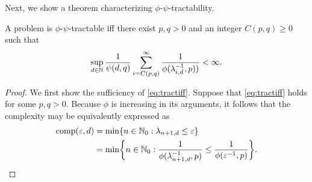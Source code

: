 \documentclass[11pt,a4paper]{article}
\begin{document}
Next, we show a theorem characterizing $\phi$-$\psi$-tractability. 
\begin{theorem}\label{thm_main_tract} 
A problem is $\phi$-$\psi$-tractable iff there exist $p,q>0$ and an integer $C(p,q) \ge 0$ such that
\begin{equation} \label{eq:tractiff}
     \sup_{d \in \mathbb{N}} \frac{1}{\psi(d,q)} \sum_{i = C(p,q)}^\infty \frac{1}{\phi(\lambda_{i, d}^{-1},p))} < \infty.
\end{equation}
\end{theorem}
\begin{proof}
We first show the sufficiency of \eqref{eq:tractiff}. Suppose that \eqref{eq:tractiff} holds for some $p,q>0$. 
Because $\phi$ is increasing in its arguments, it follows that the complexity may be equivalently expressed as 
\begin{align*}
    \operatorname{comp}(\varepsilon, d) &= \min \{n \in \mathbb{N}_{0} : \lambda_{n+1, d} \le \varepsilon\} \\
    &= \min \biggl\{n \in \mathbb{N}_{0} : \frac{1}{\phi(\lambda_{n+1, d}^{-1},p)} \le \frac{1}{\phi(\varepsilon^{-1},p)} \biggr\}.
\end{align*}


\end{proof}
\end{document}
